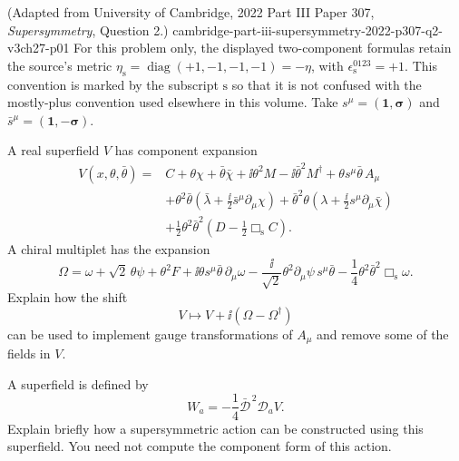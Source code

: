
\begin{enumerate}
    {(Adapted from University of Cambridge, 2022 Part III Paper 307, \emph{Supersymmetry}, Question 2.)}
    {cambridge-part-iii-supersymmetry-2022-p307-q2-v3ch27-p01}
For this problem only, the displayed two-component formulas retain the
  source's metric
  \(\eta_{\mathrm s}=\operatorname{diag}(+1,-1,-1,-1)=-\eta\), with
  \(\epsilon_{\mathrm s}^{0123}=+1\).  This convention is marked by the
  subscript \({\mathrm s}\) so that it is not confused with the mostly-plus
  convention used elsewhere in this volume.  Take
  \(s^\mu=(\mathbf 1,\boldsymbol\sigma)\) and
  \(\bar s^\mu=(\mathbf 1,-\boldsymbol\sigma)\).

  A real superfield \(V\) has component expansion
  \[
  \begin{aligned}
    V(x,\theta,\bar\theta)={}&C+\theta\chi+\bar\theta\bar\chi
      +\ii\theta^2M-\ii\bar\theta^2M^\dagger
      +\theta s^\mu\bar\theta\,A_\mu\\
    &+\theta^2\bar\theta
       \left(\bar\lambda+\frac{\ii}{2}\bar s^\mu\partial_\mu\chi\right)
      +\bar\theta^2\theta
       \left(\lambda+\frac{\ii}{2}s^\mu\partial_\mu\bar\chi\right)\\
    &+\frac12\theta^2\bar\theta^2
       \left(D-\frac12\Box_{\mathrm s}C\right).
  \end{aligned}
  \]
  A chiral multiplet has the expansion
  \[
    \Omega=\omega+\sqrt2\,\theta\psi+\theta^2F
      +\ii\theta s^\mu\bar\theta\,\partial_\mu\omega
      -\frac{\ii}{\sqrt2}\theta^2
         \partial_\mu\psi\,s^\mu\bar\theta
      -\frac14\theta^2\bar\theta^2\Box_{\mathrm s}\omega.
  \]
  Explain how the shift
  \[
    V\longmapsto V+\ii(\Omega-\Omega^\dagger)
  \]
  can be used to implement gauge transformations of \(A_\mu\) and remove
  some of the fields in \(V\).

  A superfield is defined by
  \[
    W_a=-\frac14\bar{\mathcal D}^{\,2}\mathcal D_aV.
  \]
  Explain briefly how a supersymmetric action can be constructed using this
  superfield.  You need not compute the component form of this action.


\end{enumerate}
